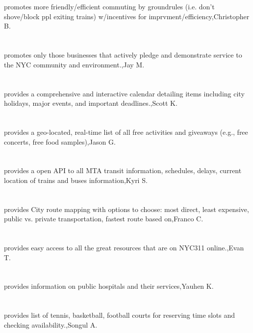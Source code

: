 \section{}promotes more friendly/efficient commuting by groundrules (i.e. don't shove/block ppl exiting trains) w/incentives for imprvment/efficiency,Christopher B.	
\section{}promotes only those businesses that actively pledge and demonstrate service to the NYC community and environment.,Jay M.	
\section{}provides a comprehensive and interactive calendar detailing items including city holidays, major events, and important deadlines.,Scott K.	
\section{}provides a geo-located, real-time list of all free activities and giveaways (e.g., free concerts, free food samples),Jason G.	
\section{}provides a open API to all MTA transit information, schedules, delays, current location of trains and buses  information,Kyri S.	
\section{}provides City route mapping with options to choose:  most direct, least expensive, public vs. private transportation, fastest route based on,Franco C.	
\section{}provides easy access to all the great resources that are on NYC311 online.,Evan T.	
\section{}provides information on public hospitals and their services,Yauhen K.	
\section{}provides list of tennis, basketball, football courts for reserving time slots and checking availability.,Songul A.	
